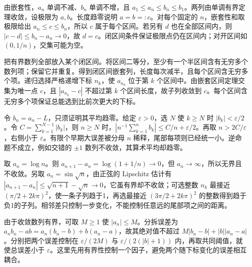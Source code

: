 \documentclass[UTF8,12pt,a4paper,fontset=fandol]{ctexart}
\begin{document}
\begin{solve}\label{ans:c2q11}
由嵌套性，$a_n$ 单调不减、$b_n$ 单调不增，且 $a_1\le a_n\le b_n\le b_1$。两列由单调有界定理收敛，设极限为 $a,b$。长度趋零说明 $a=b=:c$。对每个固定的 $n$，嵌套性和取极限给出 $a_n\le c\le b_n$，所以 $c$ 属于每个区间。若另有 $d$ 也在全部区间内，则 $|c-d|\le b_n-a_n\to0$，故 $d=c$。闭区间条件保证极限点仍在区间内；对开区间如 $(0,1/n)$，交集可能为空。
\end{solve}

\begin{solve}\label{ans:c2q12}
把有界数列全部放入某个闭区间。将区间二等分，至少有一个半区间含有无穷多个数列项；保留它并重复。得到闭区间嵌套列，长度每次减半，且每个区间含无穷多个项。递归选择严格递增下标 $n_k$，使 $a_{n_k}$ 位于第 $k$ 个区间中。由嵌套区间定理交集为唯一点 $c$，且 $|a_{n_k}-c|$ 不超过第 $k$ 个区间长度，故子列收敛到 $c$。每个区间含无穷多个项保证总能选到比前次更大的下标。
\end{solve}

\begin{solve}\label{ans:c2q13}
令 $b_n=a_n-L$，只须证明其平均趋零。给定 $\varepsilon>0$，选 $N$ 使 $k\ge N$ 时 $|b_k|<\varepsilon/2$。令 $C=\sum_{k=1}^{N-1}|b_k|$，则 $n\ge N$ 时，$|n^{-1}\sum_{k=1}^nb_k|\le C/n+\varepsilon/2$。再取 $n>2C/\varepsilon$，右侧小于 $\varepsilon$。有限个早期大误差被分母 $n$ 稀释，尾部每项则已经统一小。逆命题不成立，例如交错的 $\pm1$ 数列不收敛，其算术平均却趋零。
\end{solve}

\begin{solve}\label{ans:c2q14}
取 $a_n=\log n$。则 $a_{n+1}-a_n=\log(1+1/n)\to0$，但 $a_n\to\infty$，所以无界且不收敛。另取 $a_n=\sin\sqrt n$，由正弦的 Lipschitz 估计有 $|a_{n+1}-a_n|\le\sqrt{n+1}-\sqrt n\to0$，它虽有界却不收敛；可选整数 $n_k$ 最接近 $(\pi/2+2k\pi)^2$，使一条子列趋于1，再选最接近 $(3\pi/2+2k\pi)^2$ 的整数得到趋于负1的子列。相邻差只控制一步变化，不能控制任意远的尾部项之间的距离。
\end{solve}

\begin{solve}\label{ans:c2q15}
由于收敛数列有界，可取 $M\ge1$ 使 $|a_n|\le M$。分拆误差为 $a_nb_n-ab=a_n(b_n-b)+b(a_n-a)$，故其绝对值不超过 $M|b_n-b|+|b||a_n-a|$。分别把两个误差控制在 $\varepsilon/(2M)$ 与 $\varepsilon/(2(|b|+1))$ 内，再取共同阈值，就使总误差小于 $\varepsilon$。这里先用有界性控制一个因子，避免两个随下标变化的误差相互耦合。
\end{solve}
\end{document}
